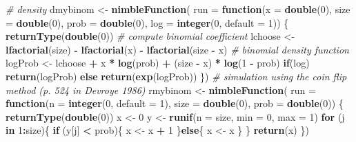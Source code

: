 \documentclass[
  12pt,
]{krantz}
\newenvironment{Shaded}{\begin{snugshade}}{\end{snugshade}}
\newcommand{\AttributeTok}[1]{\textcolor[rgb]{0.13,0.29,0.53}{#1}}
\newcommand{\CommentTok}[1]{\textcolor[rgb]{0.56,0.35,0.01}{\textit{#1}}}
\newcommand{\ControlFlowTok}[1]{\textcolor[rgb]{0.13,0.29,0.53}{\textbf{#1}}}
\newcommand{\DecValTok}[1]{\textcolor[rgb]{0.00,0.00,0.81}{#1}}
\newcommand{\FunctionTok}[1]{\textcolor[rgb]{0.13,0.29,0.53}{\textbf{#1}}}
\newcommand{\NormalTok}[1]{#1}
\newcommand{\OtherTok}[1]{\textcolor[rgb]{0.56,0.35,0.01}{#1}}
\newcommand{\SpecialCharTok}[1]{\textcolor[rgb]{0.81,0.36,0.00}{\textbf{#1}}}
\begin{document}
\begin{Shaded}
\begin{Highlighting}[]
\CommentTok{\# density}
\NormalTok{dmybinom }\OtherTok{\textless{}{-}} \FunctionTok{nimbleFunction}\NormalTok{(}
  \AttributeTok{run =} \ControlFlowTok{function}\NormalTok{(}\AttributeTok{x =} \FunctionTok{double}\NormalTok{(}\DecValTok{0}\NormalTok{), }
                 \AttributeTok{size =} \FunctionTok{double}\NormalTok{(}\DecValTok{0}\NormalTok{), }
                 \AttributeTok{prob =} \FunctionTok{double}\NormalTok{(}\DecValTok{0}\NormalTok{), }
                 \AttributeTok{log =} \FunctionTok{integer}\NormalTok{(}\DecValTok{0}\NormalTok{, }\AttributeTok{default =} \DecValTok{1}\NormalTok{)) \{}
    \FunctionTok{returnType}\NormalTok{(}\FunctionTok{double}\NormalTok{(}\DecValTok{0}\NormalTok{))}
    \CommentTok{\# compute binomial coefficient }
\NormalTok{    lchoose }\OtherTok{\textless{}{-}} \FunctionTok{lfactorial}\NormalTok{(size) }\SpecialCharTok{{-}} \FunctionTok{lfactorial}\NormalTok{(x) }\SpecialCharTok{{-}} \FunctionTok{lfactorial}\NormalTok{(size }\SpecialCharTok{{-}}\NormalTok{ x)}
    \CommentTok{\# binomial density function}
\NormalTok{    logProb }\OtherTok{\textless{}{-}}\NormalTok{ lchoose }\SpecialCharTok{+}\NormalTok{ x }\SpecialCharTok{*} \FunctionTok{log}\NormalTok{(prob) }\SpecialCharTok{+}\NormalTok{ (size }\SpecialCharTok{{-}}\NormalTok{ x) }\SpecialCharTok{*} \FunctionTok{log}\NormalTok{(}\DecValTok{1} \SpecialCharTok{{-}}\NormalTok{ prob)}
    \ControlFlowTok{if}\NormalTok{(log) }\FunctionTok{return}\NormalTok{(logProb)}
    \ControlFlowTok{else} \FunctionTok{return}\NormalTok{(}\FunctionTok{exp}\NormalTok{(logProb)) }
\NormalTok{  \})}
\CommentTok{\# simulation using the coin flip method (p. 524 in Devroye 1986)}
\NormalTok{rmybinom }\OtherTok{\textless{}{-}} \FunctionTok{nimbleFunction}\NormalTok{(}
  \AttributeTok{run =} \ControlFlowTok{function}\NormalTok{(}\AttributeTok{n =} \FunctionTok{integer}\NormalTok{(}\DecValTok{0}\NormalTok{, }\AttributeTok{default =} \DecValTok{1}\NormalTok{),}
                 \AttributeTok{size =} \FunctionTok{double}\NormalTok{(}\DecValTok{0}\NormalTok{),}
                 \AttributeTok{prob =} \FunctionTok{double}\NormalTok{(}\DecValTok{0}\NormalTok{)) \{}
    \FunctionTok{returnType}\NormalTok{(}\FunctionTok{double}\NormalTok{(}\DecValTok{0}\NormalTok{))}
\NormalTok{    x }\OtherTok{\textless{}{-}} \DecValTok{0}
\NormalTok{    y }\OtherTok{\textless{}{-}} \FunctionTok{runif}\NormalTok{(}\AttributeTok{n =}\NormalTok{ size, }\AttributeTok{min =} \DecValTok{0}\NormalTok{, }\AttributeTok{max =} \DecValTok{1}\NormalTok{)}
    \ControlFlowTok{for}\NormalTok{ (j }\ControlFlowTok{in} \DecValTok{1}\SpecialCharTok{:}\NormalTok{size)\{}
      \ControlFlowTok{if}\NormalTok{ (y[j] }\SpecialCharTok{\textless{}}\NormalTok{ prob)\{}
\NormalTok{        x }\OtherTok{\textless{}{-}}\NormalTok{ x }\SpecialCharTok{+} \DecValTok{1}
\NormalTok{      \}}\ControlFlowTok{else}\NormalTok{\{}
\NormalTok{        x }\OtherTok{\textless{}{-}}\NormalTok{ x}
\NormalTok{      \}}
\NormalTok{    \}}
    \FunctionTok{return}\NormalTok{(x)    }
\NormalTok{  \})}
\end{Highlighting}
\end{Shaded}
\end{document}
